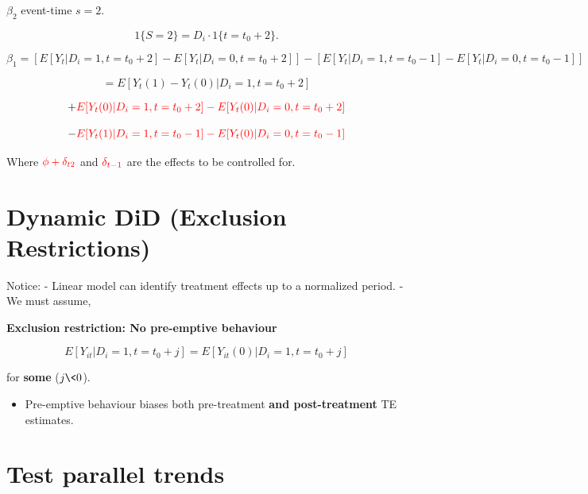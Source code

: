 \documentclass[
  letterpaper,
  DIV=11,
  numbers=noendperiod]{scrreprt}
\providecommand{\tightlist}{%
  \setlength{\itemsep}{0pt}\setlength{\parskip}{0pt}}\usepackage{longtable,booktabs,array}
\theoremstyle{definition}
\theoremstyle{remark}
\begin{document}
\begin{enumerate}
  \(\beta_2\) event-time \(s = 2\).

  \[
  1 \{S = 2\} = D_i \cdot 1 \{t = t_0+2\}.
  \]

  \[
  \beta_1 = 
  \left[ E[Y_t | D_i=1, t=t_0+2] - E[Y_t | D_i=0, t=t_0+2] \right] - 
  \left[ E[Y_t | D_i=1, t=t_0-1] - E[Y_t | D_i=0, t=t_0-1] \right]
  \]

  \[
  = E[Y_t(1) - Y_t(0) | D_i=1, t=t_0+2] 
  \]

  \[
  + \textcolor{red}{E[Y_t(0) | D_i=1, t=t_0+2] - E[Y_t(0) | D_i=0, t=t_0+2]}
  \]

  \[
  - \textcolor{red}{E[Y_t(1) | D_i=1, t=t_0-1] - E[Y_t(0) | D_i=0, t=t_0-1]}
  \]

  Where \(\textcolor{red}{\phi + \delta_{t2}}\) and
  \(\textcolor{red}{\delta_{t-1}}\) are the effects to be controlled
  for.

  \section{Dynamic DiD (Exclusion
  Restrictions)}\label{dynamic-did-exclusion-restrictions}

  Notice: - Linear model can identify treatment effects up to a
  normalized period. - We must assume,

  \begin{tcolorbox}[enhanced jigsaw, bottomrule=.15mm, coltitle=black, arc=.35mm, left=2mm, opacityback=0, leftrule=.75mm, colbacktitle=quarto-callout-note-color!10!white, title={Note}, toprule=.15mm, bottomtitle=1mm, breakable, colframe=quarto-callout-note-color-frame, opacitybacktitle=0.6, titlerule=0mm, colback=white, rightrule=.15mm, toptitle=1mm]

  \textbf{Exclusion restriction: No pre-emptive behaviour}

  \[
  E[Y_{it}|D_i = 1, t = t_0 + j] = E[Y_{it}(0)|D_i = 1, t = t_0 + j]
  \]

  for \textbf{some} (\(j \< 0\)).

  \end{tcolorbox}

  \begin{itemize}
  \tightlist
  \item
    Pre-emptive behaviour biases both pre-treatment \textbf{and
    post-treatment} TE estimates.
  \end{itemize}

  \section{Test parallel trends}\label{test-parallel-trends}


\end{enumerate}
\end{document}
